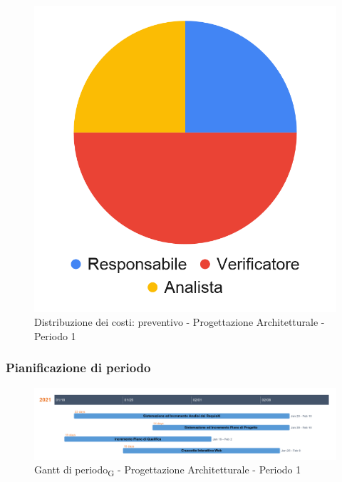 \hspace{-1cm}
\begin{minipage}{.50\textwidth}
\smallPreventivoTable{
	
}
\end{minipage}
\hspace{1cm}
\begin{minipage}{.40\textwidth}
\begin{figure}[H]
	\includegraphics[scale=0.21]{res/images/charts/preventivo_priori/Grafico4-3.png}
	\caption{Distribuzione dei costi: preventivo - Progettazione Architetturale - Periodo 1}
\end{figure}
\end{minipage} 






\subsubsection{Pianificazione di periodo}

\begin{figure}[H]
	\centering
	\includegraphics[scale=0.35]{res/images/gantt_periodo/progarch_1_gantt.png}
	\caption{Gantt di periodo\textsubscript{G} - Progettazione Architetturale - Periodo 1}
\end{figure}


